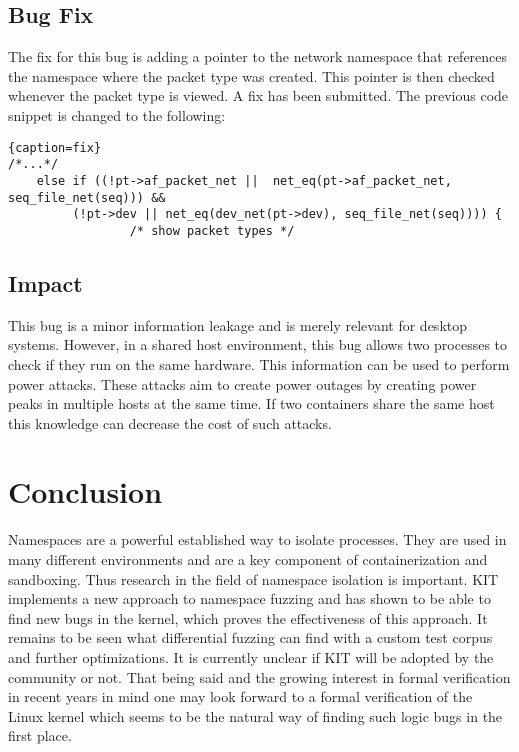 \documentclass[10pt,twocolumn,a4paper]{article}
\begin{document}
\subsection{Bug Fix}
The fix for this bug is adding a pointer to the network namespace that references the namespace
where the packet type was created. This pointer is then checked whenever the packet type is
viewed. A fix has been submitted.\cite{4}
The previous code snippet is changed to the following:
\begin{lstlisting}{caption=fix}
/*...*/
	else if ((!pt->af_packet_net ||  net_eq(pt->af_packet_net, seq_file_net(seq))) &&
		 (!pt->dev || net_eq(dev_net(pt->dev), seq_file_net(seq)))) {
                 /* show packet types */
\end{lstlisting}
\cite{4}
\subsection{Impact}
This bug is a minor information leakage and is merely relevant for desktop systems.
However, in a shared host environment, this bug allows two processes to check if they run on the same
hardware. This information can be used to perform power attacks. These attacks aim to create power
outages by creating power peaks in multiple hosts at the same time. If two containers share the same
host this knowledge can decrease the cost of such attacks\cite{7}.
\section{Conclusion}
Namespaces are a powerful established way to isolate processes. They are used in many different
environments and are a key component of containerization and sandboxing. Thus research in the field of namespace isolation is
important. KIT implements a new approach to namespace fuzzing and has shown to be able to find new bugs in the
kernel, which proves the effectiveness of this approach. It remains to be seen what differential
fuzzing can find with a custom test corpus and further optimizations. It is currently unclear if
KIT will be adopted by the community or not. That being said and the growing interest in formal
verification in recent years in mind one may look forward to a formal verification of the Linux
kernel which seems to be the natural way of finding such logic bugs in the first place.


\end{document}
